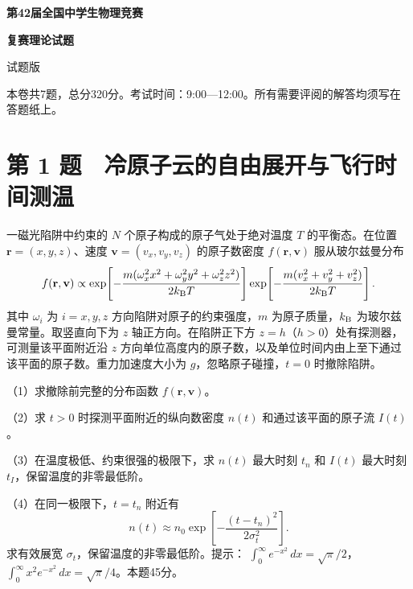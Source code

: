 \documentclass[12pt,a4paper,fontset=fandol]{ctexart}
\begin{document}
\begin{titlepage}
\thispagestyle{empty}
\vspace*{27mm}
\begin{center}
{\LARGE\bfseries 第42届全国中学生物理竞赛\par}
\vspace{8mm}
{\LARGE\bfseries 复赛理论试题\par}
\vspace{17mm}
{\Large 试题版\par}
\end{center}
\vfill
\end{titlepage}
\setcounter{page}{1}
本卷共7题，总分320分。考试时间：9:00---12:00。所有需要评阅的解答均须写在答题纸上。

\section{第 1
题　冷原子云的自由展开与飞行时间测温}\label{ux7b2c-1-ux9898-ux51b7ux539fux5b50ux4e91ux7684ux81eaux7531ux5c55ux5f00ux4e0eux98deux884cux65f6ux95f4ux6d4bux6e29}

一磁光陷阱中约束的 \(N\) 个原子构成的原子气处于绝对温度 \(T\)
的平衡态。在位置 \(\mathbf r=(x,y,z)\)、速度 \(\mathbf v=(v_x,v_y,v_z)\)
的原子数密度 \(f(\mathbf r,\mathbf v)\) 服从玻尔兹曼分布 \[
f(\mathbf r,\mathbf v)\propto
\exp\!\left[-\frac{m(\omega_x^2x^2+\omega_y^2y^2+\omega_z^2z^2)}{2k_{\rm B}T}\right]
\exp\!\left[-\frac{m(v_x^2+v_y^2+v_z^2)}{2k_{\rm B}T}\right].
\] 其中 \(\omega_i\) 为 \(i=x,y,z\) 方向陷阱对原子的约束强度，\(m\)
为原子质量，\(k_{\rm B}\) 为玻尔兹曼常量。取竖直向下为 \(z\)
轴正方向。在陷阱正下方 \(z=h\)（\(h>0\)）处有探测器，可测量该平面附近沿
\(z\)
方向单位高度内的原子数，以及单位时间内由上至下通过该平面的原子数。重力加速度大小为
\(g\)，忽略原子碰撞，\(t=0\) 时撤除陷阱。

（1）求撤除前完整的分布函数 \(f(\mathbf r,\mathbf v)\)。

（2）求 \(t>0\) 时探测平面附近的纵向数密度 \(n(t)\) 和通过该平面的原子流
\(I(t)\)。

（3）在温度极低、约束很强的极限下，求 \(n(t)\) 最大时刻 \(t_n\) 和
\(I(t)\) 最大时刻 \(t_I\)，保留温度的非零最低阶。

（4）在同一极限下，\(t=t_n\) 附近有 \[
n(t)\approx n_0\exp\!\left[-\frac{(t-t_n)^2}{2\sigma_t^2}\right].
\] 求有效展宽 \(\sigma_t\)，保留温度的非零最低阶。提示：
\(\int_0^\infty e^{-x^2}\,dx=\sqrt\pi/2\)，
\(\int_0^\infty x^2e^{-x^2}\,dx=\sqrt\pi/4\)。本题45分。
\end{document}
